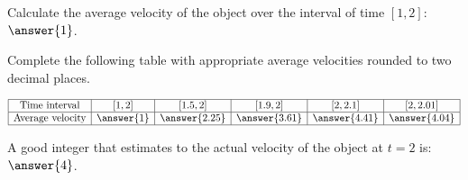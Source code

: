 \documentclass{ximera}
\begin{document}
\begin{exercise}
\begin{exercise}
\begin{exercise}
Calculate the average velocity of the object over the interval of time $\left[1,2\right]$:   $\answer{1}$.

\begin{exercise}

Complete the following table with appropriate average velocities rounded to two decimal places.

\[ \begin{array}{|c|c|c|c|c|c|}
	\hline
	\text{Time interval} & \left[1,2\right] & \left[1.5,2\right] & \left[1.9,2\right] & \left[2,2.1\right] & \left[2,2.01\right]\\\hline
	\text{Average velocity} & \answer{1} & \answer{2.25} & \answer{3.61} & \answer{4.41} & \answer{4.04} \\\hline
\end{array}\]

A good integer that estimates to the actual velocity of the object at $t = 2$ is: $\answer{4}$.

\end{exercise}
\end{exercise}
\end{exercise}
\end{exercise}
\end{document}
